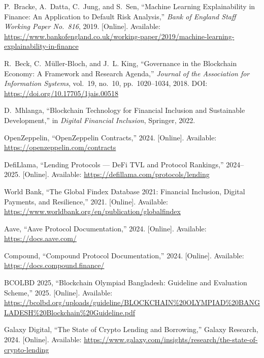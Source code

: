 \documentclass[12pt,a4paper]{report}
\begin{document}
{\begin{enumerate}[label={[\arabic*]}]
\item P.~Bracke, A.~Datta, C.~Jung, and S.~Sen, ``Machine Learning Explainability in Finance: An Application to Default Risk Analysis,'' \textit{Bank of England Staff Working Paper No.~816}, 2019. [Online]. Available: \url{https://www.bankofengland.co.uk/working-paper/2019/machine-learning-explainability-in-finance}

\item R.~Beck, C.~M\"{u}ller-Bloch, and J.~L. King, ``Governance in the Blockchain Economy: A Framework and Research Agenda,'' \textit{Journal of the Association for Information Systems}, vol.~19, no.~10, pp.~1020--1034, 2018. DOI: \url{https://doi.org/10.17705/1jais.00518}

\item D.~Mhlanga, ``Blockchain Technology for Financial Inclusion and Sustainable Development,'' in \textit{Digital Financial Inclusion}, Springer, 2022.

\item OpenZeppelin, ``OpenZeppelin Contracts,'' 2024. [Online]. Available: \url{https://openzeppelin.com/contracts}

\item DefiLlama, ``Lending Protocols --- DeFi TVL and Protocol Rankings,'' 2024--2025. [Online]. Available: \url{https://defillama.com/protocols/lending}

\item World Bank, ``The Global Findex Database 2021: Financial Inclusion, Digital Payments, and Resilience,'' 2021. [Online]. Available: \url{https://www.worldbank.org/en/publication/globalfindex}

\item Aave, ``Aave Protocol Documentation,'' 2024. [Online]. Available: \url{https://docs.aave.com/}

\item Compound, ``Compound Protocol Documentation,'' 2024. [Online]. Available: \url{https://docs.compound.finance/}

\item BCOLBD 2025, ``Blockchain Olympiad Bangladesh: Guideline and Evaluation Scheme,'' 2025. [Online]. Available: \url{https://bcolbd.org/uploads/guideline/BLOCKCHAIN\%20OLYMPIAD\%20BANGLADESH\%20Blockchain\%20Guideline.pdf}

\item Galaxy Digital, ``The State of Crypto Lending and Borrowing,'' Galaxy Research, 2024. [Online]. Available: \url{https://www.galaxy.com/insights/research/the-state-of-crypto-lending}


\end{enumerate}}
\end{document}
